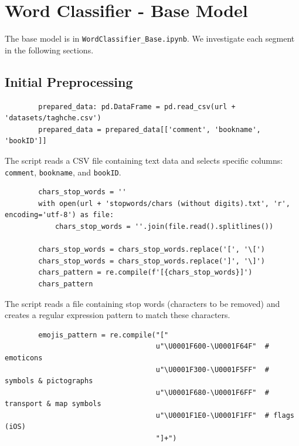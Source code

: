 \documentclass{solutionclass} %
\def\co#1{\texttt{#1}}
\begin{document}
\section{Word Classifier - Base Model}
The base model is in \co{WordClassifier\_Base.ipynb}. We investigate each segment in the following sections.


\subsection*{Initial Preprocessing}



\begin{solution}

    \begin{lstlisting}
        prepared_data: pd.DataFrame = pd.read_csv(url + 'datasets/taghche.csv')
        prepared_data = prepared_data[['comment', 'bookname', 'bookID']]
        \end{lstlisting}
        
        The script reads a CSV file containing text data and selects specific columns: \texttt{comment}, \texttt{bookname}, and \texttt{bookID}.
        
        \begin{lstlisting}
        chars_stop_words = ''
        with open(url + 'stopwords/chars (without digits).txt', 'r', encoding='utf-8') as file:
            chars_stop_words = ''.join(file.read().splitlines())
        
        chars_stop_words = chars_stop_words.replace('[', '\[')
        chars_stop_words = chars_stop_words.replace(']', '\]')
        chars_pattern = re.compile(f'[{chars_stop_words}]')
        chars_pattern
        \end{lstlisting}
        
        The script reads a file containing stop words (characters to be removed) and creates a regular expression pattern to match these characters.
        
        \begin{lstlisting}
        emojis_pattern = re.compile("["
                                    u"\U0001F600-\U0001F64F"  # emoticons
                                    u"\U0001F300-\U0001F5FF"  # symbols & pictographs
                                    u"\U0001F680-\U0001F6FF"  # transport & map symbols
                                    u"\U0001F1E0-\U0001F1FF"  # flags (iOS)
                                    "]+")
        \end{lstlisting}
        

\end{solution}
\end{document}

